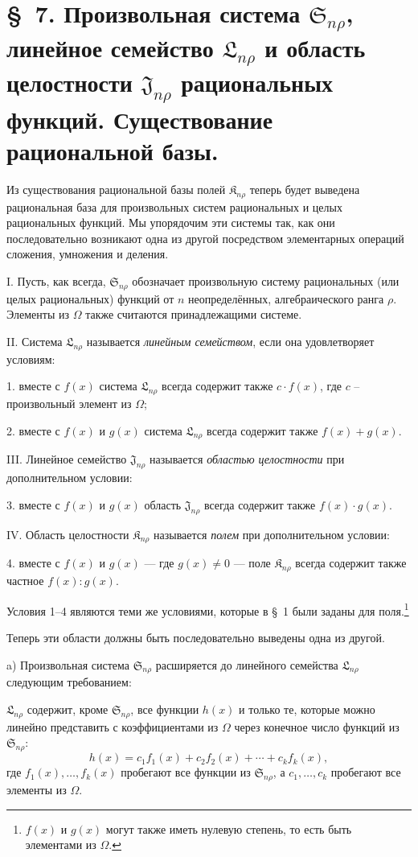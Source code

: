 \documentclass[11pt]{article}
\providecommand{\Kfield}{\mathfrak{K}}
\providecommand{\Ssys}{\mathfrak{S}}
\providecommand{\Jdom}{\mathfrak{J}}
\providecommand{\Lsys}{\mathfrak{L}}
\begin{document}
\section*{\S\ 7. Произвольная система $\Ssys_{n\rho}$, линейное семейство $\Lsys_{n\rho}$ и область целостности $\Jdom_{n\rho}$ рациональных функций. Существование рациональной базы.}

Из существования рациональной базы полей $\Kfield_{n\rho}$ теперь будет выведена рациональная база для произвольных систем рациональных и целых рациональных функций. Мы упорядочим эти системы так, как они последовательно возникают одна из другой посредством элементарных операций сложения, умножения и деления.

I. Пусть, как всегда, $\Ssys_{n\rho}$ обозначает произвольную систему рациональных (или целых рациональных) функций от $n$ неопределённых, алгебраического ранга $\rho$. Элементы из $\Omega$ также считаются принадлежащими системе.

II. Система $\Lsys_{n\rho}$ называется \emph{линейным семейством}, если она удовлетворяет условиям:

1. вместе с $f(x)$ система $\Lsys_{n\rho}$ всегда содержит также $c\cdot f(x)$, где $c$ -- произвольный элемент из $\Omega$;

2. вместе с $f(x)$ и $g(x)$ система $\Lsys_{n\rho}$ всегда содержит также $f(x)+g(x)$.

III. Линейное семейство $\Jdom_{n\rho}$ называется \emph{областью целостности} при дополнительном условии:

3. вместе с $f(x)$ и $g(x)$ область $\Jdom_{n\rho}$ всегда содержит также $f(x)\cdot g(x)$.

IV. Область целостности $\Kfield_{n\rho}$ называется \emph{полем} при дополнительном условии:

4. вместе с $f(x)$ и $g(x)$ --- где $g(x)\ne0$ --- поле $\Kfield_{n\rho}$ всегда содержит также частное $f(x):g(x)$.

Условия 1--4 являются теми же условиями, которые в \S\ 1 были заданы для поля.\footnote{$f(x)$ и $g(x)$ могут также иметь нулевую степень, то есть быть элементами из $\Omega$.}

Теперь эти области должны быть последовательно выведены одна из другой.

a) Произвольная система $\Ssys_{n\rho}$ расширяется до линейного семейства $\Lsys_{n\rho}$ следующим требованием:

$\Lsys_{n\rho}$ содержит, кроме $\Ssys_{n\rho}$, все функции $h(x)$ и только те, которые можно линейно представить с коэффициентами из $\Omega$ через конечное число функций из $\Ssys_{n\rho}$:
\[
  h(x)=c_1f_1(x)+c_2f_2(x)+\cdots+c_kf_k(x),
\]
где $f_1(x),\ldots,f_k(x)$ пробегают все функции из $\Ssys_{n\rho}$, а $c_1,\ldots,c_k$ пробегают все элементы из $\Omega$.
\end{document}
